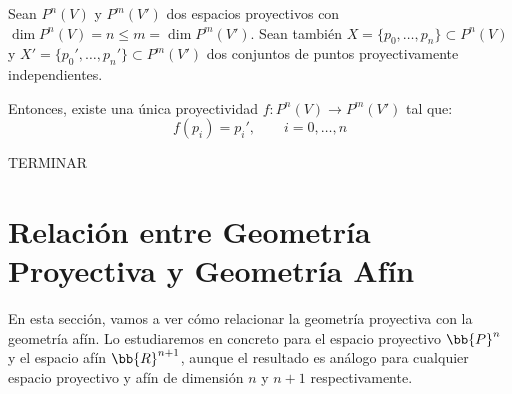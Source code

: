 \begin{teo}
    Sean $P^n(V)$ y $P^m(V')$ dos espacios proyectivos con $\dim P^n(V) = n \leq m = \dim P^m(V')$.
    Sean también $X=\{p_0, \dots, p_n\}\subset P^n(V)$ y $X'=\{p_0', \dots, p_n'\}\subset P^m(V')$ dos conjuntos de puntos proyectivamente independientes.

    Entonces, existe una única proyectividad $f:P^n(V)\to P^m(V')$ tal que:
    \begin{equation*}
        f(p_i) = p_i',\qquad i=0,\dots,n
    \end{equation*}
\end{teo}
\begin{comment}
\begin{proof}
    Como $\pi,\pi'$ son sobreyectivas, sean $v_0,\dots,v_n\in V^\ast$ y $v_0',\dots,v_n'\in V'^\ast$ tales que:
    \begin{equation*}
        \pi(v_i) = p_i,\qquad \pi'(v_i') = p_i',\hspace{1cm} i=0,\dots,n
    \end{equation*}

    Como $X$ es un conjunto de puntos proyectivamente independientes, tenemos que $\{v_0,\dots,v_n\}$ es un conjunto de vectores linealmente independientes.
    Además, como $\dim V = n+1$, tenemos que $\{v_0,\dots,v_n\}$ es una base de $V$. Por tanto, por el Teorema Fundamental del Álgebra Lineal, $\exists! \wt{f}:V\to V'$ lineal tal que:
    \begin{equation*}
        \wt{f}(v_i) = v_i',\hspace{1cm} i=0,\dots,n
    \end{equation*}

    Además, como por hipótesis $\{v_0',\dots,v_n'\}$ es un conjunto de vectores linealmente independientes,
    tenemos que $\wt{f}$ es inyectiva, por lo que $f$ es una proyectividad con lineal asociada $\wt{f}$.

\end{proof}
\end{comment}
TERMINAR %


\section{Relación entre Geometría Proyectiva y Geometría Afín}

En esta sección, vamos a ver cómo relacionar la geometría proyectiva con la geometría afín.
Lo estudiaremos en concreto para el espacio proyectivo $\bb{P}^n$ y el espacio afín $\bb{R}^{n+1}$,
aunque el resultado es análogo para cualquier espacio proyectivo y afín de dimensión $n$ y $n+1$ respectivamente.

